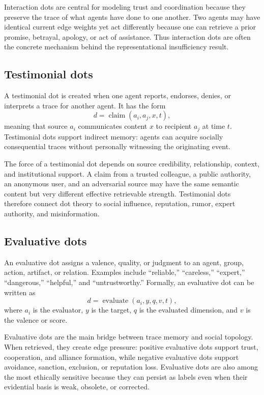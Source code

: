 \documentclass[11pt]{article}
\theoremstyle{remark}
\begin{document}
Interaction dots are central for modeling trust and coordination because they preserve the trace of what agents have done to one another. Two agents may have identical current edge weights yet act differently because one can retrieve a prior promise, betrayal, apology, or act of assistance. Thus interaction dots are often the concrete mechanism behind the representational insufficiency result.

\subsection{Testimonial dots}\label{testimonial-dots}

A testimonial dot is created when one agent reports, endorses, denies, or interprets a trace for another agent. It has the form
\[
d=\operatorname{claim}(a_i,a_j,x,t),
\]
meaning that source $a_i$ communicates content $x$ to recipient $a_j$ at time $t$. Testimonial dots support indirect memory: agents can acquire socially consequential traces without personally witnessing the originating event.

The force of a testimonial dot depends on source credibility, relationship, context, and institutional support. A claim from a trusted colleague, a public authority, an anonymous user, and an adversarial source may have the same semantic content but very different effective retrievable strength. Testimonial dots therefore connect dot theory to social influence, reputation, rumor, expert authority, and misinformation.

\subsection{Evaluative dots}\label{evaluative-dots}

An evaluative dot assigns a valence, quality, or judgment to an agent, group, action, artifact, or relation. Examples include ``reliable,'' ``careless,'' ``expert,'' ``dangerous,'' ``helpful,'' and ``untrustworthy.'' Formally, an evaluative dot can be written as
\[
d=\operatorname{evaluate}(a_i,y,q,v,t),
\]
where $a_i$ is the evaluator, $y$ is the target, $q$ is the evaluated dimension, and $v$ is the valence or score.

Evaluative dots are the main bridge between trace memory and social topology. When retrieved, they create edge pressure: positive evaluative dots support trust, cooperation, and alliance formation, while negative evaluative dots support avoidance, sanction, exclusion, or reputation loss. Evaluative dots are also among the most ethically sensitive because they can persist as labels even when their evidential basis is weak, obsolete, or corrected.
\end{document}
